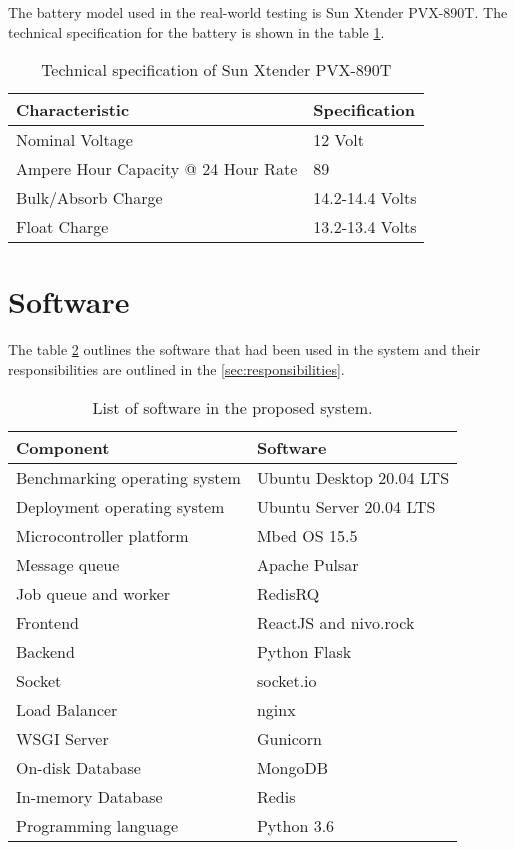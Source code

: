 \documentclass[../thesis.tex]{subfiles}
\begin{document}
The battery model used in the real-world testing is Sun Xtender PVX-890T. The technical specification for the battery is shown in the table \ref{tab:pvx890t}. 

\begin{table}[h!]
	\begin{center}
		\caption{Technical specification of Sun Xtender PVX-890T}
		\label{tab:pvx890t}
		\begin{tabular}{l|l}
			\toprule
			\textbf{Characteristic} & \textbf{Specification}\\
			\midrule
			Nominal Voltage & 12 Volt\\
			Ampere Hour Capacity @ 24 Hour Rate & 89\\
			Bulk/Absorb Charge & 14.2-14.4 Volts\\
			Float Charge & 13.2-13.4 Volts\\
			\bottomrule
		\end{tabular}
	\end{center}
\end{table}

\section{Software}
\label{sec:software}

The table \ref{tab:softwareList} outlines the software that had been used in the system and their responsibilities are outlined in the \autoref{sec:responsibilities}. 

\begin{table}[h!]
	\begin{center}
		\caption{List of software in the proposed system.}
		\label{tab:softwareList}
		\begin{tabular}{l|l}
			\toprule
			\textbf{Component} & \textbf{Software}\\
			\midrule
			Benchmarking operating system & Ubuntu Desktop 20.04 LTS\\
			Deployment operating system & Ubuntu Server 20.04 LTS\\
			Microcontroller platform & Mbed OS 15.5\\
			Message queue & Apache Pulsar\\
			Job queue and worker & RedisRQ\\
			Frontend & ReactJS and nivo.rock\\
			Backend & Python Flask\\
			Socket & socket.io\\
			Load Balancer & nginx\\
			WSGI Server & Gunicorn\\
			On-disk Database & MongoDB\\
			In-memory Database & Redis\\
			Programming language & Python 3.6\\
			\bottomrule
		\end{tabular}
	\end{center}
\end{table}
\end{document}
